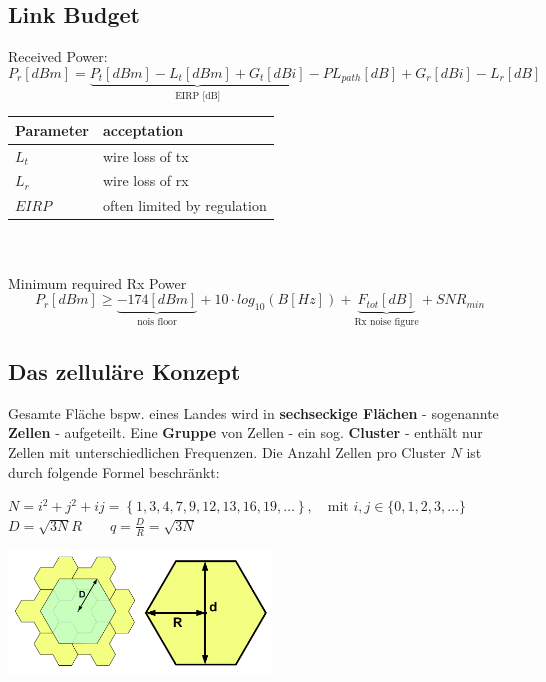 \subsection{Link Budget}
Received Power:
\begin{equation*}
	P_r [dBm] = \underbrace{P_t [dBm] - L_t [dBm] + G_t[dBi]}_{\text{EIRP [dB]}} - PL_{path}[dB] + G_r[dBi] -L_r[dB]
\end{equation*}

\begin{tabular}{ll}
\textbf{Parameter} & \textbf{acceptation} \\ \hline
$L_t$ & wire loss of tx \\ 
$L_r$ & wire loss of rx \\ 
$EIRP$ & often limited by regulation \\ 
\end{tabular} \\ \\

Minimum required Rx Power
\begin{equation*}
	P_r [dBm] \geq \underbrace{-174[dBm]}_{\text{nois floor}} + 10 \cdot log_{10}(B [Hz]) + \underbrace{F_{tot}[dB]}_{\text{Rx noise figure}} + SNR_{min}
\end{equation*}

\subsection{Das zelluläre Konzept }
	\begin{minipage}{12cm}
		Gesamte Fläche bspw. eines Landes wird in \textbf{sechseckige Flächen} - sogenannte \textbf{Zellen} - aufgeteilt. 
		Eine \textbf{Gruppe} von Zellen - ein sog. \textbf{Cluster} - enthält nur Zellen mit unterschiedlichen Frequenzen.
		Die Anzahl Zellen pro Cluster $N$ ist durch folgende Formel beschränkt:
		\begin{center}
	        $ N=i^2+j^2+ij = \left\{1,3,4,7,9,12,13,16,19,\ldots\right\}, \quad \text{mit } i,j \in
	        \{0,1,2,3,\ldots \} $ \\ $ D = \sqrt{3N} R \qquad q = \frac{D}{R} =
	        \sqrt{3N} $
        \end{center}
	\end{minipage}
	\begin{minipage}{8cm}
	    \includegraphics[width=7cm]{./bilder/systems-cluster.png}
	\end{minipage}

